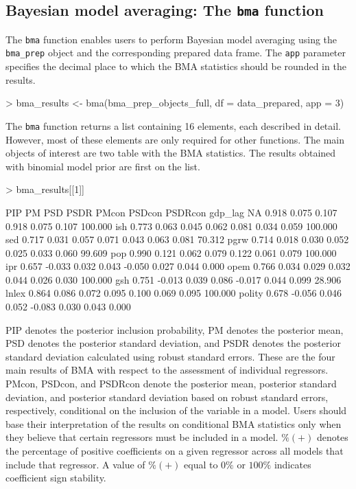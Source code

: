 \documentclass[a4paper]{article}
\begin{document}
\subsection{Bayesian model averaging: The \texttt{bma} function}
The \verb+bma+ function enables users to perform Bayesian model averaging using the \verb+bma_prep+ object and the corresponding prepared data frame. The \verb+app+ parameter specifies the decimal place to which the BMA statistics should be rounded in the results.
\begin{Schunk}
\begin{Sinput}
> bma_results <- bma(bma_prep_objects_full, df = data_prepared, app = 3)
\end{Sinput}
\end{Schunk}
The \verb+bma+ function returns a list containing 16 elements, each described in detail. However, most of these elements are only required for other functions. The main objects of interest are two table with the BMA statistics. The results obtained with binomial model prior are first on the list.
\begin{Schunk}
\begin{Sinput}
> bma_results[[1]]
\end{Sinput}
\begin{Soutput}
          PIP     PM   PSD  PSDR  PMcon PSDcon PSDRcon    %
gdp_lag    NA  0.918 0.075 0.107  0.918  0.075   0.107 100.000
ish     0.773  0.063 0.045 0.062  0.081  0.034   0.059 100.000
sed     0.717  0.031 0.057 0.071  0.043  0.063   0.081  70.312
pgrw    0.714  0.018 0.030 0.052  0.025  0.033   0.060  99.609
pop     0.990  0.121 0.062 0.079  0.122  0.061   0.079 100.000
ipr     0.657 -0.033 0.032 0.043 -0.050  0.027   0.044   0.000
opem    0.766  0.034 0.029 0.032  0.044  0.026   0.030 100.000
gsh     0.751 -0.013 0.039 0.086 -0.017  0.044   0.099  28.906
lnlex   0.864  0.086 0.072 0.095  0.100  0.069   0.095 100.000
polity  0.678 -0.056 0.046 0.052 -0.083  0.030   0.043   0.000
\end{Soutput}
\end{Schunk}

PIP denotes the posterior inclusion probability, PM denotes the posterior mean, PSD denotes the posterior standard deviation, and PSDR denotes the posterior standard deviation calculated using robust standard errors. These are the four main results of BMA with respect to the assessment of individual regressors. PMcon, PSDcon, and PSDRcon denote the posterior mean, posterior standard deviation, and posterior standard deviation based on robust standard errors, respectively, conditional on the inclusion of the variable in a model. Users should base their interpretation of the results on conditional BMA statistics only when they believe that certain regressors must be included in a model. $\%(+)$ denotes the percentage of positive coefficients on a given regressor across all models that include that regressor. A value of $\%(+)$ equal to $0\%$ or $100\%$ indicates coefficient sign stability.
\end{document}
